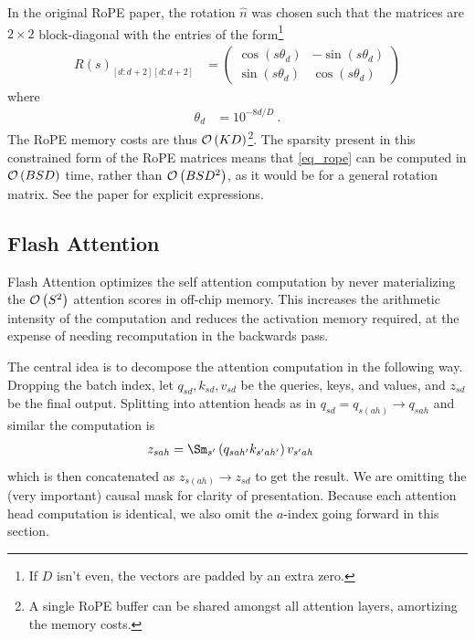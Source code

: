 \documentclass[11pt]{article}
\begin{document}
In the original RoPE paper, the rotation $ \hat{n} $ was chosen such that the matrices are $ 2
	\times  2 $ block-diagonal with the entries of the form\footnote{If $ D $ isn't even, the vectors
	are padded by an extra zero.}
\begin{align}
	R(s)_{ [d:d+2][d:d+2] } & =\begin{pmatrix}
		                           \cos \left ( s \theta _{ d }   \right ) & -\sin \left ( s \theta _{ d }   \right ) \\
		                           \sin \left ( s \theta _{ d }   \right ) & \cos \left ( s \theta _{ d }   \right )
	                           \end{pmatrix}
\end{align}
where
\begin{align}
	\theta _{ d } & = 10 ^{ -8d/D   } \ .
\end{align}
The RoPE memory costs are thus $ \mathcal{O} \left( K D \right)  $\footnote{A single RoPE buffer can be
shared amongst all attention layers, amortizing the memory costs.}. The sparsity present in this constrained form of the RoPE matrices means that
\eqref{eq_rope} can be computed in $ \mathcal{O} \left( BSD \right)  $ time, rather than $ \mathcal{O} \left(
BSD ^{ 2 } \right)$, as it would be for a general rotation matrix. See the paper for explicit
expressions.


\subsection{Flash Attention \label{subsec_flash_attention}}


Flash Attention \cite{dao2022flashattention, dao2023flashattention2} optimizes the self attention
computation by never materializing the $ \mathcal{O} \left( S ^{ 2 } \right)  $ attention scores in
off-chip memory. This increases the arithmetic intensity of the computation and reduces the
activation memory required, at the expense of needing recomputation in the backwards pass.


The central idea is to decompose the attention computation in the following way. Dropping the batch
index, let $ q _{ sd }, k _{ sd }, v _{ sd } $ be the queries, keys, and values, and $ z _{ sd } $
be the final output. Splitting into attention heads as in $ q _{ sd } = q _{ s(ah) }\longrightarrow
q _{ sah } $ and similar the computation is
\begin{align}
    z _{ sah } &= \Sm _{ s' } \left ( q _{ sah' } k _{ s'ah' } \right ) v _{ s'ah }
\end{align}
which is then concatenated as $ z _{ s(ah) }\longrightarrow  z _{ sd } $ to get the result. We are
omitting the (very important) causal mask for clarity of presentation.  Because each attention head
computation is identical, we also omit the $ a $-index going forward in this section.
\end{document}
